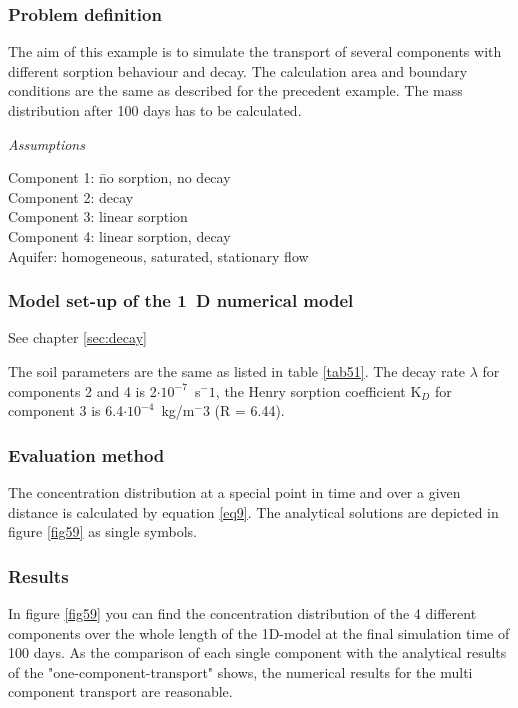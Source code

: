 \subsubsection*{Problem definition}

The aim of this example is to simulate the transport of several components with different sorption behaviour and decay. The calculation area and boundary conditions are the same as described for the precedent example. The mass distribution after 100 days has to be calculated.

\textsl{Assumptions}

\begin{tabbing}
Component 1: \= no sorption, no decay \\
Component 2: \> decay \\
Component 3: \> linear sorption \\
Component 4: \> linear sorption, decay \\
Aquifer: \> homogeneous, saturated, stationary flow \\
\end{tabbing}

\subsubsection*{Model set-up of the 1~D numerical model}

See chapter \ref{sec:decay}

The soil parameters are the same as listed in table \ref{tab51}. The decay rate $\lambda$ for components 2 and 4 is 2$\cdot 10^{-7}$~s$^-1$, the Henry sorption coefficient K$_D$ for component 3 is 6.4$\cdot 10^{-4}$~kg/m$^-3$ (R = 6.44).

\subsubsection*{Evaluation method}
The concentration distribution at a special point in time and over a given distance is calculated by equation \ref{eq9}. The analytical solutions are depicted in figure \ref{fig59} as single symbols.

\subsubsection*{Results}

In figure \ref{fig59} you can find the concentration distribution of the 4 different components over the whole length of the 1D-model at the final simulation time of 100 days. As the comparison of each single component with the analytical results of the "one-component-transport" shows, the numerical results for the multi component transport are reasonable.

